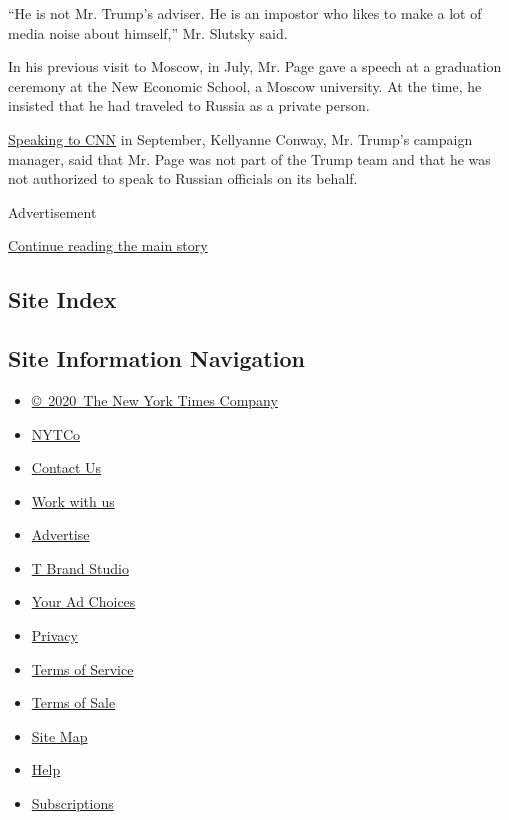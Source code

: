 ``He is not Mr. Trump's adviser. He is an impostor who likes to make a
lot of media noise about himself,'' Mr. Slutsky said.

In his previous visit to Moscow, in July, Mr. Page gave a speech at a
graduation ceremony at the New Economic School, a Moscow university. At
the time, he insisted that he had traveled to Russia as a private
person.

\href{http://edition.cnn.com/videos/tv/2016/09/25/sotu-carter-page-2.cnn}{Speaking
to CNN} in September, Kellyanne Conway, Mr. Trump's campaign manager,
said that Mr. Page was not part of the Trump team and that he was not
authorized to speak to Russian officials on its behalf.

Advertisement

\protect\hyperlink{after-bottom}{Continue reading the main story}

\hypertarget{site-index}{%
\subsection{Site Index}\label{site-index}}

\hypertarget{site-information-navigation}{%
\subsection{Site Information
Navigation}\label{site-information-navigation}}

\begin{itemize}
\tightlist
\item
  \href{https://help.nytimes.com/hc/en-us/articles/115014792127-Copyright-notice}{©~2020~The
  New York Times Company}
\end{itemize}

\begin{itemize}
\tightlist
\item
  \href{https://www.nytco.com/}{NYTCo}
\item
  \href{https://help.nytimes.com/hc/en-us/articles/115015385887-Contact-Us}{Contact
  Us}
\item
  \href{https://www.nytco.com/careers/}{Work with us}
\item
  \href{https://nytmediakit.com/}{Advertise}
\item
  \href{http://www.tbrandstudio.com/}{T Brand Studio}
\item
  \href{https://www.nytimes.com/privacy/cookie-policy\#how-do-i-manage-trackers}{Your
  Ad Choices}
\item
  \href{https://www.nytimes.com/privacy}{Privacy}
\item
  \href{https://help.nytimes.com/hc/en-us/articles/115014893428-Terms-of-service}{Terms
  of Service}
\item
  \href{https://help.nytimes.com/hc/en-us/articles/115014893968-Terms-of-sale}{Terms
  of Sale}
\item
  \href{https://spiderbites.nytimes.com}{Site Map}
\item
  \href{https://help.nytimes.com/hc/en-us}{Help}
\item
  \href{https://www.nytimes.com/subscription?campaignId=37WXW}{Subscriptions}
\end{itemize}
